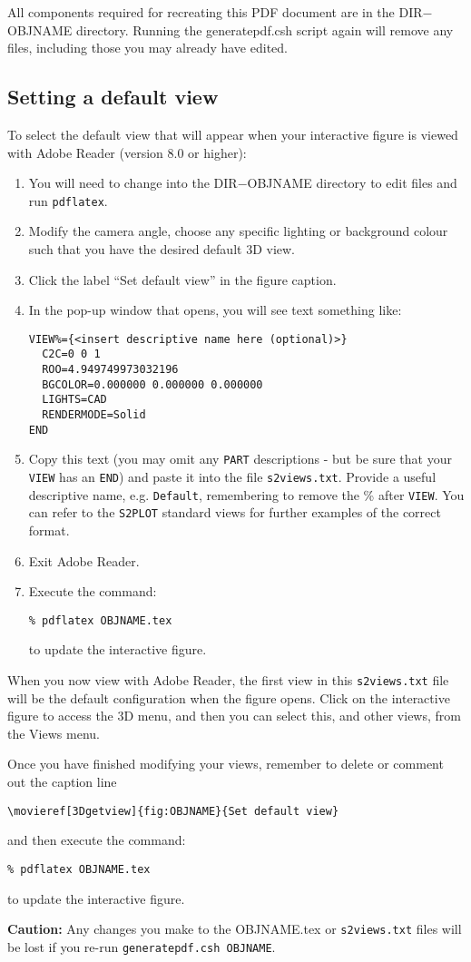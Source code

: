 \documentclass{article}
\begin{document}
All components required for recreating this PDF document are in the DIR$-$OBJNAME
directory.  Running the {\sc generatepdf.csh} script again will remove any files, including
those you may already have edited.

\subsection*{Setting a default view}
To select the default view that will appear when your interactive figure is viewed
with Adobe Reader (version 8.0 or higher):
\begin{enumerate}
\item You will need to change into the DIR$-$OBJNAME directory to edit files and
run {\tt pdflatex}.
\item Modify the camera angle, choose any specific lighting or background colour
such that you have the desired default 3D view.
\item Click the label ``Set default view'' in the figure caption.
\item In the pop-up window that opens, you will see text something like:\\

\begin{verbatim}
VIEW%={<insert descriptive name here (optional)>}
  C2C=0 0 1
  ROO=4.949749973032196
  BGCOLOR=0.000000 0.000000 0.000000
  LIGHTS=CAD
  RENDERMODE=Solid
END
\end{verbatim}

\item Copy this text (you may omit any {\tt PART} descriptions - but be sure that
your {\tt VIEW} has an {\tt END}) and paste it into the file {\tt s2views.txt}.
Provide a useful descriptive name, e.g. {\tt Default}, remembering to remove the \%
after {\tt VIEW}.  You can refer to the {\tt S2PLOT} standard views for further
examples of the correct format.

\item Exit Adobe Reader.

\item Execute the command:
\begin{verbatim}
% pdflatex OBJNAME.tex
\end{verbatim}
to update the interactive figure.
\end{enumerate}

When you now view with Adobe Reader, the first view in this {\tt s2views.txt} file
will be the default configuration when the figure opens. Click on the
interactive figure to access the 3D menu, and then you can select this, and
other views, from the Views menu.

Once you have finished modifying your views, remember to delete or comment out
the caption line
\begin{verbatim}
\movieref[3Dgetview]{fig:OBJNAME}{Set default view}
\end{verbatim}
and then execute the command:
\begin{verbatim}
% pdflatex OBJNAME.tex
\end{verbatim}
to update the interactive figure.

{\bf Caution:} Any changes you make to the OBJNAME.tex or {\tt s2views.txt}
files will be lost if you re-run {\tt generatepdf.csh OBJNAME}.
\end{document}
